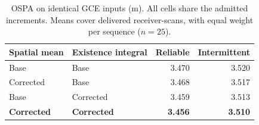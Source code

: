 \begin{table}[t]
\centering
\caption{OSPA on identical GCE inputs (m). All cells share the admitted increments. Means cover delivered receiver-scans, with equal weight per sequence ($n=25$).}
\label{tab:fixedinput}
\small
\begin{tabular*}{\columnwidth}{@{\extracolsep{\fill}}llrr@{}}
\toprule
Spatial mean & Existence integral & Reliable & Intermittent \\
\midrule
Base & Base & 3.470 & 3.520 \\
Corrected & Base & 3.468 & 3.517 \\
Base & Corrected & 3.459 & 3.513 \\
\midrule
\textbf{Corrected} & \textbf{Corrected} & \textbf{3.456} & \textbf{3.510} \\
\bottomrule
\end{tabular*}
\end{table}
